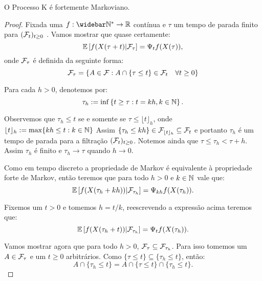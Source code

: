 \begin{teorema}
  \label{teo:markov-forte}
  O Processo K é fortemente Markoviano.
\end{teorema}
\begin{proof}
  Fixada uma $f: \Nzb \to \R$ contínua e $\tau$ um tempo de parada
  finito para $({\mathcal{F}}_t)_{t \geq 0}$ . Vamos mostrar que quase
  certamente:
  \begin{equation}
    \label{eq:markov-forte}
    {\mathbb{E}} \left[ f(X(\tau + t) \middle| {\mathcal{F}}_\tau \right]
    = \Psi_t f (X(\tau)),
  \end{equation}
  onde ${\mathcal{F}}_\tau$ é definida da seguinte forma:
  \begin{displaymath}
    {\mathcal{F}}_\tau = \left\{
      A \in {\mathcal{F}}:  A \cap \{\tau \leq t\} \in {\mathcal{F}}_t \quad \forall t \geq 0 
    \right\}
  \end{displaymath}


  Para cada $h > 0$, denotemos por: 
  \begin{displaymath}
    \tau_h := \inf\left\{
      t \geq \tau: t = k h, k \in {\mathbb{N}}
    \right\}.
  \end{displaymath}

  Observemos que $\tau_h \leq t$ se e somente se $\tau \leq \lfloor t
  \rfloor_h$, onde $\lfloor t \rfloor_h := \max\{k h \leq t: k \in
  {\mathbb{N}}\}$ Assim $\{\tau_h \leq k h\} \in {\mathcal{F}}_{\lfloor t \rfloor_h}
  \subseteq {\mathcal{F}}_t$ e portanto $\tau_h$ é um tempo de parada para a
  filtração $({\mathcal{F}}_{t})_{t \geq 0}$. Notemos ainda que $\tau \leq \tau_h
  < \tau + h$. Assim $\tau_h$ é \qc finito e $\tau_h \to \tau$ \qc
  quando $h \to 0$.

  Como em tempo discreto a propriedade de Markov é equivalente à
  propriedade forte de Markov, então teremos que para todo $h > 0$ e
  $k \in {\mathbb{N}}$ vale que:
 \begin{displaymath}
    {\mathbb{E}} \left[ f(X(\tau_h + k h)) \middle| {\mathcal{F}}_{\tau_h} \right]
    = \Psi_{k h} f (X(\tau_h)).
  \end{displaymath}
  
  Fixemos um $t > 0$ e tomemos $h = t/k$, reescrevendo a expressão acima
  teremos que:
  \begin{equation}
    \label{eq:markov-forte-esp-cond}
    {\mathbb{E}} \left[ f(X(\tau_h + t)) \middle| {\mathcal{F}}_{\tau_h} \right]
    = \Psi_t f (X(\tau_h)).
  \end{equation}
  

  Vamos mostrar agora que para todo $h > 0$, ${\mathcal{F}}_{\tau} \subseteq
  {\mathcal{F}}_{\tau_h}$. Para isso tomemos um $A \in {\mathcal{F}}_\tau$ e um $t \geq 0$
  arbitrários. Como $\{\tau \leq t\} \subseteq \{\tau_h \leq t\}$,
  então:
  \begin{displaymath}
    A \cap \{ \tau_h \leq t \} =
    A \cap \{ \tau \leq t \} \cap \{ \tau_h \leq t \}.
  \end{displaymath}
  

\end{proof}
